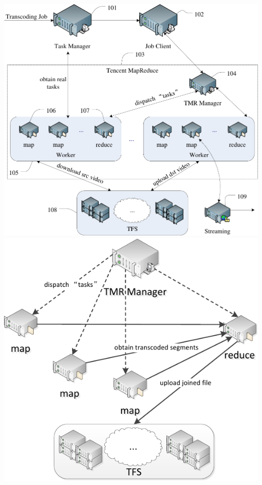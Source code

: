 \documentclass{beamer}
\begin{document}
\begin{frame}
\includegraphics[scale=0.33]{fig/总体方案.pdf}\hspace*{0.1cm}
\includegraphics[scale=0.44]{fig/reduce.pdf}
\end{frame}
\end{document}
